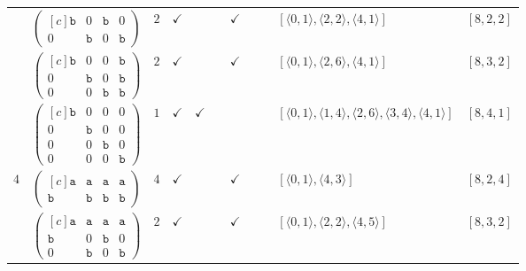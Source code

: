 \documentclass[12pt]{article}
\theoremstyle{definition}
\theoremstyle{plain}
\begin{document}
{\begin{longtable}{@{}cYcccccccZc@{}}
& $\begin{pmatrix*}[c]
\mathtt{b}   &  0    &  \mathtt{b}    &   0  \\
0   &  \mathtt{b}    &  0    &   \mathtt{b}
\end{pmatrix*}$
& $2$
& $\checkmark$
&
&
& $\checkmark$
&
&
& $[\langle0,1\rangle,\allowbreak\langle2,2\rangle,\allowbreak\langle4,1\rangle]$
& $[8,2,2]$\\

\cmidrule(lr){2-11}

& $\begin{pmatrix*}[c]
\mathtt{b}  &  0  &  0  &  \mathtt{b}  \\
0  &  \mathtt{b}  &  0  &  \mathtt{b}   \\
0  &  0  &  \mathtt{b}  &  \mathtt{b}
\end{pmatrix*}$
& $2$
& $\checkmark$
&
&
& $\checkmark$
&
&
& $[\langle0,1\rangle,\allowbreak\langle2,6\rangle,\allowbreak\langle4,1\rangle]$
& $[8,3,2]$\\

\cmidrule(lr){2-11}


& $\begin{pmatrix*}[c]
\mathtt{b}  &  0  &  0  &  0  \\
0  &  \mathtt{b}  &  0  &  0  \\
0  &  0  &  \mathtt{b}  &  0  \\
0  &  0  &  0  &  \mathtt{b}
\end{pmatrix*}$
& $1$
& $\checkmark$
& $\checkmark$
&
&
&
&
& $[\langle0,1\rangle,\allowbreak\langle1,4\rangle,\allowbreak\langle2,6\rangle,\allowbreak\langle3,4\rangle,\allowbreak\langle4,1\rangle]$
& $[8,4,1]$
\\


$4$
& $\begin{pmatrix*}[c]
\mathtt{a}  &  \mathtt{a}  &  \mathtt{a}  &  \mathtt{a}  \\
\mathtt{b}  &  \mathtt{b}  &  \mathtt{b}  &  \mathtt{b}
\end{pmatrix*}$
& $4$
& $\checkmark$
&
&
& $\checkmark$
&
&
& $[\langle0,1\rangle,\allowbreak\langle4,3\rangle]$
& $[8,2,4]$     \\

\cmidrule(lr){2-11}


& $\begin{pmatrix*}[c]
\mathtt{a}  &  \mathtt{a}  &  \mathtt{a}  &  \mathtt{a}  \\
\mathtt{b}  &  0  &  \mathtt{b}  &  0   \\
0  &  \mathtt{b}  &  0  &  \mathtt{b}
\end{pmatrix*}$
& $2$
& $\checkmark$
&
&
& $\checkmark$
&
&
& $[\langle0,1\rangle,\allowbreak\langle2,2\rangle,\allowbreak\langle4,5\rangle]$
& $[8,3,2]$\\


\end{longtable}}
\end{document}
